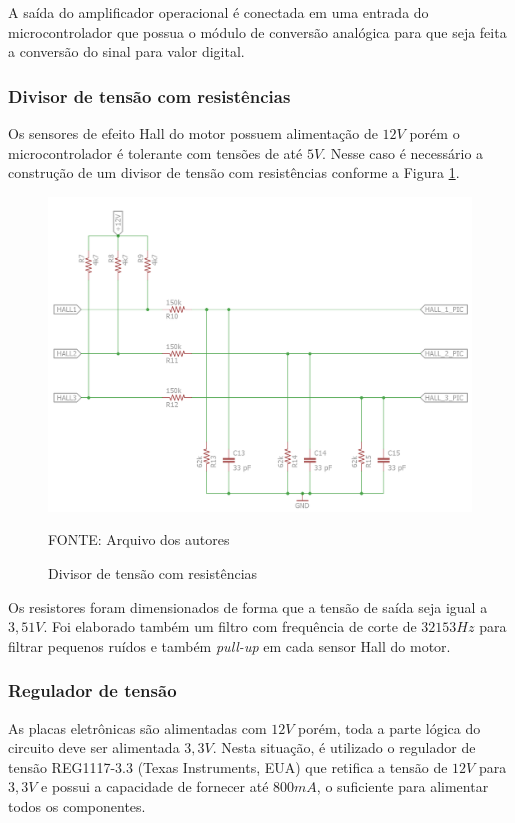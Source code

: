 \documentclass[
	12pt,				%
	openany,			%
	twoside,			%
	a4paper,			%
	english,			%
	french,				%
	spanish,			%
	brazil,				%
	oldfontcommands
	]{abntex2}
\begin{document}
A saída do amplificador operacional é conectada em uma entrada do microcontrolador que possua o módulo de conversão analógica para que seja feita a conversão do sinal para valor digital.  

\subsubsection{Divisor de tensão com resistências}

Os sensores de efeito Hall do motor possuem alimentação de $12V$ porém o microcontrolador é tolerante com tensões de até $5V$. Nesse caso é necessário a construção de um divisor de tensão com resistências  conforme a Figura \ref{fig:Divisor_tensao}. 

\begin{figure}[th]
	\caption{Divisor de tensão com resistências}
	\centering
	\includegraphics[width=0.75\linewidth]{./figs/Halls_motores}
	
	\begin{small}
		FONTE: Arquivo dos autores
	\end{small}
	\label{fig:Divisor_tensao}
\end{figure}

\newpage

Os resistores foram dimensionados de forma que a tensão de saída seja igual a $3,51V$. Foi elaborado também um filtro com frequência de corte de $32153Hz$ para filtrar pequenos ruídos e também \textit{pull-up} em cada sensor Hall do motor.

\subsubsection{Regulador de tensão}

As placas eletrônicas são alimentadas com $12V$ porém, toda a parte lógica do circuito deve ser alimentada $3,3V$. Nesta situação, é utilizado o regulador de tensão REG1117-3.3 (Texas Instruments, EUA) que retifica a tensão de $12V$ para $3,3V$ e possui a capacidade de fornecer até $800mA$, o suficiente para alimentar todos os componentes.
\end{document}
